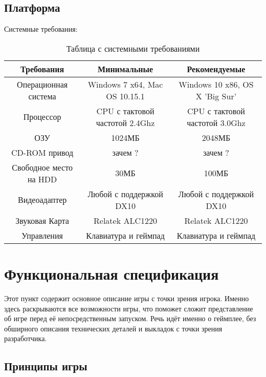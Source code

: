 \documentclass{article}
\begin{document}
\subsection{Платформа}
    \item Системные требования:
    	\begin{table}[h]
        \centering
        \begin{tabular}{|c|c|c|}
            \hline
            Требования & Минимальные & Рекомендуемые \\
            \hline
            Операционная система & Windows 7 x64, Mac OS 10.15.1 & Windows 10 x86, OS X 'Big Sur'\\
            \hline
            Процессор & CPU с тактовой частотой 2.4Ghz& CPU с тактовой частотой 3.0Ghz \\
            \hline
            ОЗУ & 1024МБ & 2048МБ \\
            \hline
            CD-ROM привод & зачем ? & зачем ? \\
            \hline
            Свободное место на HDD & 30МБ & 100МБ \\
            \hline
            Видеоадаптер & Любой с поддержкой DX10 & Любой с поддержкой DX10 \\
            \hline
            Звуковая Карта & Relatek ALC1220 & Relatek ALC1220 \\
            \hline
            Управления & Клавиатура и геймпад & Клавиатура и геймпад \\
            \hline
        \end{tabular}
        \caption{Таблица с системными требованиями}
        \label{tab:systemrequirements}
\end{table}


\section{Функциональная спецификация}

Этот пункт содержит основное описание игры с точки зрения игрока. Именно здесь раскрываются все возможности игры, что поможет сложит представление об игре перед её непосредственным запуском. Речь идёт именно о геймплее, без обширного описания технических деталей и выкладок с точки зрения разработчика. 


\subsection{Принципы игры}
\end{document}

